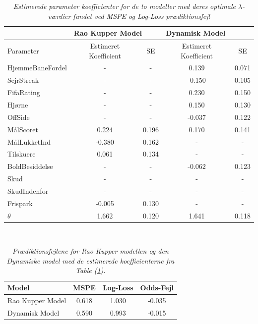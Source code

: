 \documentclass[11pt,a4paper]{article}
\begin{document}
\begin{table}[ht!]
\centering
\begin{adjustbox}{max width=\textwidth}
\begin{tabular}{|l|cc|cc|}
\hline
\multicolumn{1}{|l|}{} & \multicolumn{2}{l|}{Rao Kupper Model} & \multicolumn{2}{l|}{Dynamisk Model} \\\hline 
Parameter & Estimeret Koefficient & SE & Estimeret Koefficient & SE\\
 \hline
HjemmeBaneFordel & - & - & 0.139 & 0.071\\
SejrStreak & - & - & -0.150 & 0.105 \\
FifaRating & - & - & 0.230 & 0.150 \\
Hjørne & - & - & 0.150 & 0.130 \\
OffSide  & - & - & -0.037 & 0.122 \\
MålScoret  & 0.224 & 0.196 & 0.170 & 0.141 \\
MålLukketInd  & -0.380 & 0.162 & - & -\\
Tilskuere & 0.061 & 0.134 & - & -\\
BoldBesiddelse & - & - & -0.062 & 0.123  \\
Skud & - & - & - & -\\
SkudIndenfor & - & - & - & -\\
Frispark & -0.005 & 0.130 & - & -\\
$\theta$ & 1.662 & 0.120 & 1.641 & 0.118\\
   \hline   
\end{tabular} 
\end{adjustbox}
\caption{\label{tab:EstKoefOptLambda}\textit{Estimerede parameter koefficienter for de to modeller med deres optimale $\lambda$-værdier fundet ved MSPE og Log-Loss prædiktionsfejl}}
\end{table}\\
\begin{table}[hbt!]
\centering
\begin{adjustbox}{max width=\textwidth}
\begin{tabular}{|l|ccc|}
\hline 
Model & MSPE & Log-Loss & Odds-Fejl \\
 \hline
Rao Kupper Model & 0.618 & 1.030 & -0.035\\
Dynamisk Model & 0.590 & 0.993 & -0.015 \\
   \hline   
\end{tabular} 
\end{adjustbox}
\caption{\label{tab:MSPELOGLOSODDSFEJL}\textit{Prædiktionsfejlene for Rao Kupper modellen og den Dynamiske model med de estimerede koefficienterne fra Table (\ref{tab:EstKoefOptLambda}).}}
\end{table}\\
\end{document}
